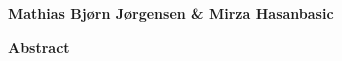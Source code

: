 \thispagestyle{plain}
\begin{center}
    \vspace{0.4cm}
    \textbf{Mathias Bjørn Jørgensen \& Mirza Hasanbasic}

    \vspace{0.9cm}
    \textbf{Abstract}
\end{center}


